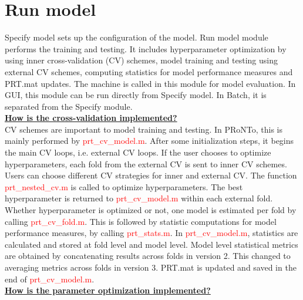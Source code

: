 



\section{Run model}

Specify model sets up the configuration of the model. Run model module performs the training and testing. It includes hyperparameter optimization by using inner cross-validation (CV) schemes, model training and testing using external CV schemes, computing statistics for model performance measures and PRT.mat updates. The machine is called in this module for model evaluation. In GUI, this module can be run directly from Specify model. In Batch, it is separated from the Specify module.
\\

\noindent \textbf{\underline{How is the cross-validation implemented?}}
\\

CV schemes are important to model training and testing. In PRoNTo, this is mainly performed by \textcolor{red}{prt\_cv\_model.m}. After some initialization steps, it begins the main CV loops, i.e. external CV loops. If the user chooses to optimize hyperparameters, each fold from the external CV is sent to inner CV schemes. Users can choose different CV strategies for inner and external CV. The function \textcolor{red}{prt\_nested\_cv.m} is called to optimize hyperparameters. The best hyperparameter is returned to \textcolor{red}{prt\_cv\_model.m} within each external fold. Whether hyperparameter is optimized or not, one model is estimated per fold by calling \textcolor{red}{prt\_cv\_fold.m}. This is followed by statistic computations for model performance measures, by calling \textcolor{red}{prt\_stats.m}. In \textcolor{red}{prt\_cv\_model.m}, statistics are calculated and stored at fold level and model level. Model level statistical metrics are obtained by concatenating results across folds in version 2. This changed to averaging metrics across folds in version 3. PRT.mat is updated and saved in the end of \textcolor{red}{prt\_cv\_model.m}.
\\[2cm]

\noindent \textbf{\underline{How is the parameter optimization implemented?}}
\\

